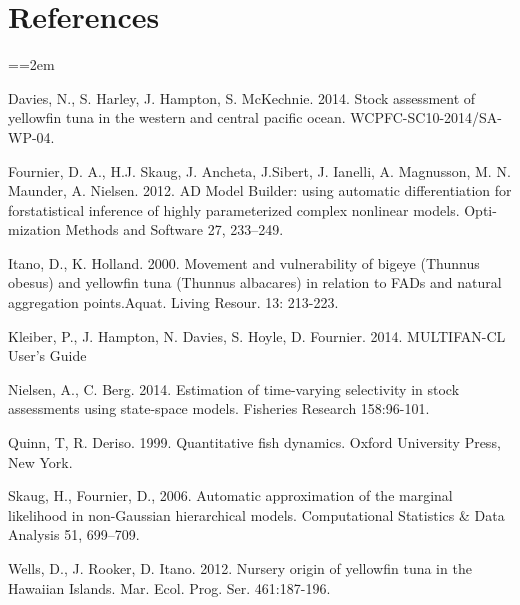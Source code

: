 \documentclass[12pt,letterpaper]{article}
\newcommand\doublespacing{\baselineskip=1.6\normalbaselineskip}
\begin{document}
\section*{References}
{\parindent=0cm \small
\everypar={\hangindent=2em }\par
\doublespacing

Davies, N., S. Harley, J. Hampton, S. McKechnie. 2014. Stock
assessment of yellowfin tuna in the western and central pacific ocean.
WCPFC-SC10-2014/SA-WP-04.

Fournier, D. A., H.J. Skaug, J. Ancheta, J.Sibert, J. Ianelli, 
A. Magnusson, M. N. Maunder, A. Nielsen. 2012. AD Model Builder:
using automatic differentiation for forstatistical inference of highly
parameterized complex nonlinear models. Opti-mization Methods and
Software 27, 233–249.

Itano, D., K. Holland. 2000.  Movement and vulnerability of bigeye
(Thunnus obesus) and yellowfin tuna (Thunnus albacares) in relation to
FADs and natural aggregation points.Aquat. Living Resour. 13: 213-223.

Kleiber, P., J. Hampton, N. Davies, S. Hoyle, D. Fournier. 2014.
MULTIFAN-CL User’s Guide

Nielsen, A., C. Berg. 2014. Estimation of time-varying selectivity
in stock assessments using state-space models. Fisheries Research
158:96-101.

Quinn, T, R. Deriso. 1999. Quantitative fish dynamics. Oxford
University Press, New York.

Skaug, H., Fournier, D., 2006. Automatic approximation of the marginal
likelihood in non-Gaussian hierarchical models. Computational
Statistics \& Data Analysis 51, 699–709.

Wells, D., J. Rooker, D. Itano. 2012.  Nursery origin of yellowfin
tuna in the Hawaiian Islands. Mar. Ecol. Prog. Ser. 461:187-196. 
\par}

\end{document}
